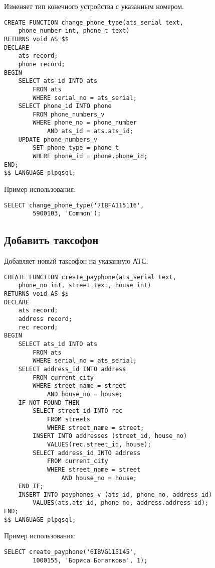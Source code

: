 \documentclass{report}
\begin{document}
Изменяет тип конечного устройства с указанным номером.

\begin{lstlisting}
CREATE FUNCTION change_phone_type(ats_serial text, 
    phone_number int, phone_t text) 
RETURNS void AS $$
DECLARE
    ats record;
    phone record;
BEGIN
    SELECT ats_id INTO ats 
        FROM ats 
        WHERE serial_no = ats_serial;
    SELECT phone_id INTO phone
        FROM phone_numbers_v
        WHERE phone_no = phone_number
            AND ats_id = ats.ats_id;
    UPDATE phone_numbers_v
        SET phone_type = phone_t 
        WHERE phone_id = phone.phone_id;
END;
$$ LANGUAGE plpgsql;
\end{lstlisting}

Пример использования:
\begin{lstlisting}
SELECT change_phone_type('7IBFA115116',
        5900103, 'Common');
\end{lstlisting}

\subsection*{Добавить таксофон}

Добавляет новый таксофон на указанную АТС.

\begin{lstlisting}
CREATE FUNCTION create_payphone(ats_serial text, 
    phone_no int, street text, house int) 
RETURNS void AS $$
DECLARE
    ats record;
    address record;
    rec record;
BEGIN
    SELECT ats_id INTO ats 
        FROM ats 
        WHERE serial_no = ats_serial;
    SELECT address_id INTO address
        FROM current_city
        WHERE street_name = street
            AND house_no = house;
    IF NOT FOUND THEN
        SELECT street_id INTO rec 
            FROM streets 
            WHERE street_name = street;
        INSERT INTO addresses (street_id, house_no)
            VALUES(rec.street_id, house);
        SELECT address_id INTO address
            FROM current_city
            WHERE street_name = street
                AND house_no = house;
    END IF;
    INSERT INTO payphones_v (ats_id, phone_no, address_id)
        VALUES(ats.ats_id, phone_no, address.address_id);
END;
$$ LANGUAGE plpgsql;
\end{lstlisting}

Пример использования:
\begin{lstlisting}
SELECT create_payphone('6IBVG115145',
        1000155, 'Бориса Богаткова', 1);
\end{lstlisting}
\end{document}

